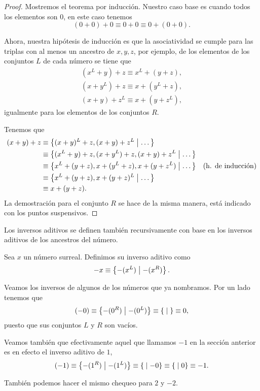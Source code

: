     \begin{proof}
        Mostremos el teorema por inducci\'on. Nuestro caso base es cuando todos los elementos son $0$, en este caso tenemos
        \[
            (0+0)+0 \equiv 0+0 \equiv 0+(0+0).
        \]

        Ahora, nuestra hip\'otesis de inducci\'on es que la asociatividad se cumple para las triplas con al menos un ancestro de $x,y,z$, por ejemplo, de los elementos de los conjuntos $L$ de cada n\'umero se tiene que
        \begin{align*}
            (x^L+y)+z \equiv x^L + (y+z), \\
            (x+y^L)+z \equiv x + (y^L+z), \\
            (x+y)+z^L \equiv x + (y+z^L),
        \end{align*}
        igualmente para los elementos de los conjuntos $R$.

        Tenemos que
        \begin{align*}
            (x+y)+z & \equiv \left\{(x+y)^L+z, (x+y)+z^L\;\middle|\; \dots\right\} & \\
                    & \equiv \left\{(x^L+y)+z, (x+y^L)+z, (x+y)+z^L\;\middle|\; \dots\right\} & \\
                    & \equiv \left\{x^L+(y+z), x+(y^L+z), x+(y+z^L)\;\middle|\; \dots\right\} & \text{(h. de inducci\'on)}  \\
                    & \equiv \left\{x^L+(y+z), x+(y+z)^L\;\middle|\; \dots\right\} & \\
                    & \equiv x+(y+z). & 
        \end{align*}
        La demostraci\'on para el conjunto $R$ se hace de la misma manera, est\'a indicado con los puntos suspensivos.
    \end{proof}

    Los inversos aditivos se definen tambi\'en recursivamente con base en los inversos aditivos de los ancestros del n\'umero.

    \begin{definition}
        Sea $x$ un n\'umero surreal. Definimos su inverso aditivo como
        \[
            -x \equiv \left\{-(x^L)\;\middle|\; -(x^R)\right\}.
        \]
    \end{definition}

    \begin{example}
        Veamos los inversos de algunos de los n\'umeros que ya nombramos. Por un lado tenemos que
        \[
            (-0) \equiv \left\{-(0^R)\;\middle|\; -(0^L)\right\} \equiv \left\{\;\middle|\; \right\} \equiv 0,
        \]
        puesto que sus conjuntos $L$ y $R$ son vac\'ios.

        Veamos tambi\'en que efectivamente aquel que llamamos $-1$ en la secci\'on anterior es en efecto el inverso aditivo de $1$,
        \[
            (-1) \equiv \left\{-(1^R)\;\middle|\; -(1^L)\right\} \equiv \left\{\;\middle|\; -0\right\} \equiv \left\{\;\middle|\; 0\right\} \equiv -1.     
        \]

        Tambi\'en podemos hacer el mismo chequeo para $2$ y $-2$.
    \end{example}

